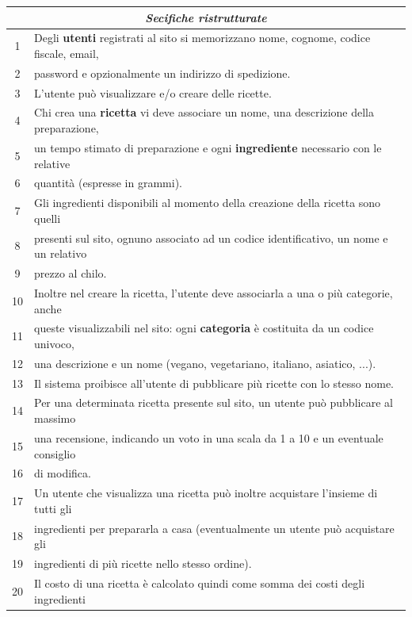 \begin{table}[H]
\centering
\setlength{\extrarowheight}{2pt}
\begin{tabularx}{\textwidth}{|c|X|}
\hline
\multicolumn{2}{|c|}{\textit{\textbf{Secifiche ristrutturate}}} \\
\hline
1 & Degli \textbf{utenti} registrati al sito si memorizzano nome, cognome, codice fiscale, email, \\
2 & password e opzionalmente un indirizzo di spedizione. \\
3 & L’utente può visualizzare e/o creare delle ricette. \\
4 & Chi crea una \textbf{ricetta} vi deve associare un nome, una descrizione della preparazione, \\
5 & un tempo stimato di preparazione e ogni \textbf{ingrediente} necessario con le relative \\
6 & quantità (espresse in grammi). \\
7 & Gli ingredienti disponibili al momento della creazione della ricetta sono quelli \\
8 & presenti sul sito, ognuno associato ad un codice identificativo, un nome e un relativo \\
9 & prezzo al chilo. \\
10 & Inoltre nel creare la ricetta, l’utente deve associarla a una o più categorie, anche \\
11 & queste visualizzabili nel sito: ogni \textbf{categoria} è costituita da un codice univoco, \\
12 & una descrizione e un nome (vegano, vegetariano, italiano, asiatico, ...). \\
13 & Il sistema proibisce all’utente di pubblicare più ricette con lo stesso nome. \\
14 & Per una determinata ricetta presente sul sito, un utente può pubblicare al massimo \\
15 & una recensione, indicando un voto in una scala da 1 a 10 e un eventuale consiglio \\
16 & di modifica. \\
17 & Un utente che visualizza una ricetta può inoltre acquistare l’insieme di tutti gli \\
18 & ingredienti per prepararla a casa (eventualmente un utente può acquistare gli \\
19 & ingredienti di più ricette nello stesso ordine). \\
20 & Il costo di una ricetta è calcolato quindi come somma dei costi degli ingredienti \\

\end{tabularx}
\end{table}
